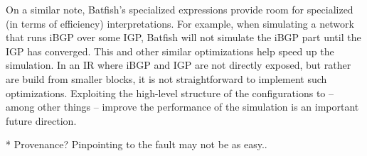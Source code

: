 \documentclass[sigconf,10pt]{acmart}
\begin{document}
On a similar note, Batfish's specialized expressions provide room for
specialized (in terms of efficiency) interpretations. For example,
when simulating a network that runs iBGP over some IGP, Batfish will
not simulate the iBGP part until the IGP has converged. This and other
similar optimizations help speed up the simulation. In an IR where
iBGP and IGP are not directly exposed, but rather are build from
smaller blocks, it is not straightforward to implement such
optimizations. Exploiting the high-level structure of the
configurations to -- among other things -- improve the performance of
the simulation is an important future direction.

* Provenance? Pinpointing to the fault may not be as easy..





\end{document}
